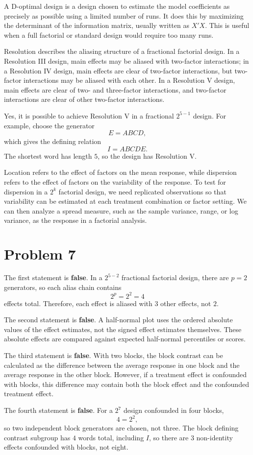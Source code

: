 \documentclass[answers,12pt,addpoints]{exam}
\begin{document}
\begin{solution}
A D-optimal design is a design chosen to estimate the model coefficients as precisely as possible using a limited number of runs. It does this by maximizing the determinant of the information matrix, usually written as $X'X$. This is useful when a full factorial or standard design would require too many runs.

Resolution describes the aliasing structure of a fractional factorial design. In a Resolution III design, main effects may be aliased with two-factor interactions; in a Resolution IV design, main effects are clear of two-factor interactions, but two-factor interactions may be aliased with each other. In a Resolution V design, main effects are clear of two- and three-factor interactions, and two-factor interactions are clear of other two-factor interactions.

Yes, it is possible to achieve Resolution V in a fractional $2^{5-1}$ design. For example, choose the generator
\[
E=ABCD,
\]
which gives the defining relation
\[
I=ABCDE.
\]
The shortest word has length $5$, so the design has Resolution V.

Location refers to the effect of factors on the mean response, while dispersion refers to the effect of factors on the variability of the response. To test for dispersion in a $2^k$ factorial design, we need replicated observations so that variability can be estimated at each treatment combination or factor setting. We can then analyze a spread measure, such as the sample variance, range, or log variance, as the response in a factorial analysis.
\end{solution}

\section{Problem 7}

\begin{solution}
The first statement is \textbf{false}. In a $2^{5-2}$ fractional factorial design, there are $p=2$ generators, so each alias chain contains
\[
2^p=2^2=4
\]
effects total. Therefore, each effect is aliased with $3$ other effects, not $2$.

The second statement is \textbf{false}. A half-normal plot uses the ordered absolute values of the effect estimates, not the signed effect estimates themselves. These absolute effects are compared against expected half-normal percentiles or scores.

The third statement is \textbf{false}. With two blocks, the block contrast can be calculated as the difference between the average response in one block and the average response in the other block. However, if a treatment effect is confounded with blocks, this difference may contain both the block effect and the confounded treatment effect.

The fourth statement is \textbf{false}. For a $2^7$ design confounded in four blocks,
\[
4=2^2,
\]
so two independent block generators are chosen, not three. The block defining contrast subgroup has $4$ words total, including $I$, so there are $3$ non-identity effects confounded with blocks, not eight.
\end{solution}
\end{document}
